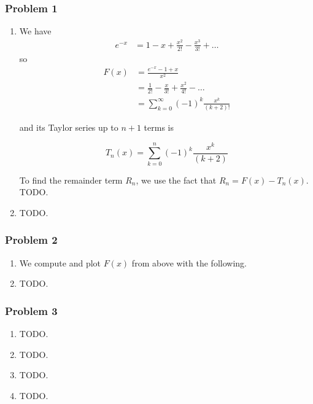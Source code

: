 \documentclass[letter,11pt]{article}
\begin{document}
\subsubsection*{Problem 1}
\begin{enumerate}[label=\alph*.]
  \item We have \begin{align*}
    e^{-x} &= 1 - x + \frac{x^2}{2!} - \frac{x^3}{3!} + \dots
  \end{align*}
  so
  \begin{align*}
    F(x) &= \frac{e^{-x} - 1 + x}{x^2} \\
    &= \frac{1}{2!} - \frac{x}{3!} + \frac{x^2}{4!} - \dots \\
    &= \sum_{k = 0}^\infty (-1)^k \frac{x^k}{(k + 2)!}
  \end{align*}

  and its Taylor series up to $n + 1$ terms is

  $$
  T_n(x) = \sum_{k = 0}^n (-1)^k \frac{x^k}{(k + 2)}
  $$

  To find the remainder term $R_n$, we use the fact that $R_n = F(x) - T_n(x)$. TODO.
  \item TODO.
\end{enumerate}

\subsubsection*{Problem 2}
\begin{enumerate}[label=\alph*.]
  \item We compute and plot $F(x)$ from above with the following.

  

  \item TODO.
\end{enumerate}

\subsubsection*{Problem 3}
\begin{enumerate}[label=\alph*.]
  \item TODO.
  \item TODO.
  \item TODO.
  \item TODO.
\end{enumerate}
\end{document}
